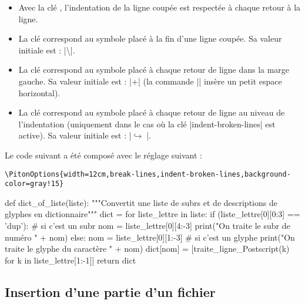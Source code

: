 \documentclass[dvipsnames,svgnames]{article}
\begin{document}
\begin{itemize}
\item {} Avec la clé , l'indentation de la ligne coupée est respectée à chaque retour
à la ligne. 

\item {} La clé  correspond au symbole placé à la fin d'une ligne coupée. Sa valeur initiale est : 
|\hspace*{0.5em}\textbackslash|.

\item {} La clé  correspond au symbole placé à chaque retour de ligne dans la marge
gauche. Sa valeur initiale est : |+\;| (la commande |\;| insère un petit espace horizontal). 

\item {} La clé  correspond au symbole placé à chaque retour de ligne
au niveau de l'indentation (uniquement dans le cas où la clé |indent-broken-lines| est active). Sa valeur initiale
est : |$\hookrightarrow\;$|.
\end{itemize}

\bigskip
Le code suivant a été composé avec le réglage suivant :  

\begin{Verbatim}
\PitonOptions{width=12cm,break-lines,indent-broken-lines,background-color=gray!15}
\end{Verbatim}

\begin{center}
\begin{Piton}
def dict_of_liste(liste):
    """Convertit une liste de subrs et de descriptions de glyphes en dictionnaire"""
    dict = {}
    for liste_lettre in liste:
        if (liste_lettre[0][0:3] == 'dup'): # si c'est un subr
            nom = liste_lettre[0][4:-3]
            print("On traite le subr de numéro " + nom)
        else:
            nom = liste_lettre[0][1:-3] # si c'est un glyphe
            print("On traite le glyphe du caractère " + nom)
        dict[nom] = [traite_ligne_Postscript(k) for k in liste_lettre[1:-1]]
    return dict
\end{Piton}
\end{center}


\bigskip
\subsection{Insertion d'une partie d'un fichier}
\end{document}
